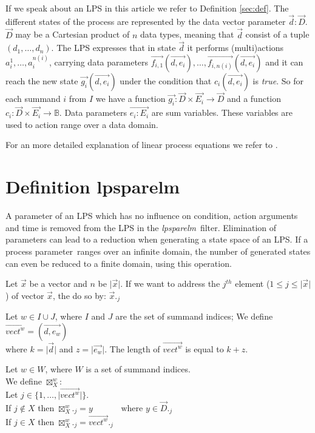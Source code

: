 \documentclass[a4paper,10pt]{article}
\theoremstyle{plain}
\theoremstyle{definition}
\newcommand{\lps}{linear process equation}
\newcommand{\tool}{\textit{lpsparelm}}
\newcommand{\ti}{\textit}
\newcommand{\ovr}{\overrightarrow}
\newcommand{\pp}{process parameter}
\begin{document}
If we speak about an LPS in this article we refer to Definition \ref{sec:def}.  The different states 
of the process are represented by the data vector parameter $\ovr{d}:\ovr{D}$. $\ovr{D}$ may be a Cartesian product of $n$ data types, meaning that $\ovr{d}$ consist of a tuple $(d_1, \ldots, d_n)$. The LPS expresses that in state $\ovr{d}$ it performs (multi)actions $a_i^1, \ldots , a_i^{n(i)}$, carrying data parameters $\ovr{f_{i,1}}(\ovr{d,e_i}), \ldots , \ovr{f_{i,n(i)}}(\ovr{d, e_i})$ and 
it can reach the new state $\ovr{g_i}(\ovr{d ,e_i})$ under the condition that $c_i(\ovr{d , e_i})$ is \ti{true}. So for each summand $i$ from $I$ we have a function $\ovr{g_i}: \ovr{D} \times \ovr{E_i} \rightarrow \ovr{D}$ and a function $c_i: \ovr{D} \times \ovr{E_i} \rightarrow \mathbb{B}$.
Data parameters $\ovr{e_i : E_i}$ are sum variables. These variables are used to action range over a data domain. 

For an more detailed explanation of \lps s  we refer to \cite{LPS_info}.

\section{Definition lpsparelm}
A parameter of an LPS which has no influence on condition, action arguments and time is removed from the LPS in the \tool\ filter. Elimination of parameters can lead to a reduction when generating a state space of an LPS. If a \pp\ ranges over an infinite domain, the number of generated states can even be reduced to a finite domain, using this operation. %

\begin{defn}
Let $\ovr{x}$ be a vector and  $n$ be $\vert \ovr{x} \vert$. If we want to address the $j^{th}$ element ($ 1 \leq j \leq \vert \ovr{x} \vert $) of vector $\ovr{x}$, the do so by:
$\ovr{x}._j$
\end{defn}

\begin{defn}
Let $w \in I \cup J$, where $I$ and $J$ are the set of summand indices; We define \\
 $\ovr{vect^w} = (\ovr{d , e_w})$\\
where $k = \vert \ovr{d} \vert$ and $z = \vert \ovr{e_w} \vert$. The length of $ \ovr{vect^w}$ is equal to $k + z$.
\end{defn}

\begin{defn}[$\boxtimes^w_X$]
Let $w \in W$, where $W$ is a set of summand indices.\\
We define $\boxtimes^w_X$:\\
Let $j \in \lbrace 1, \dots, \vert \ovr{vect^w} \vert \rbrace.$\\
If $j \not\in X$ then $\boxtimes^w_X._j = y \hspace{40pt} \text{where }y \in \ovr{D}._j$ \\
If $j \in X$ then $\boxtimes^w_X._j = \ovr{vect^w}._j$ \\
\end{defn}
\end{document}
